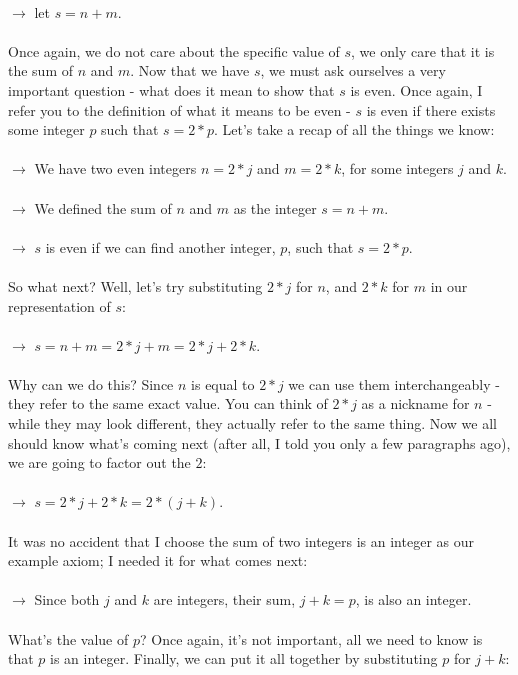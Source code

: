 \documentclass[a4paper,12pt]{article}
\begin{document}
\\
$\rightarrow$ let $s = n + m$.\\
\\
Once again, we do not care about the specific value of $s$, we only care that it is the sum of $n$ and $m$. Now that we have $s$, we must ask ourselves a very important question - what does it mean to show that $s$ is even. Once again, I refer you to the definition of what it means to be even - $s$ is even if there exists some integer $p$ such that $s = 2*p$. Let's take a recap of all the things we know:\\
\\
$\rightarrow$ We have two even integers $n = 2*j$ and $m = 2*k$, for some integers $j$ and $k$.\\
\\
$\rightarrow$ We defined the sum of $n$ and $m$ as the integer $s = n + m$. \\
\\
$\rightarrow$ $s$ is even if we can find another integer, $p$, such that $s = 2*p$.\\
\\
So what next? Well, let's try substituting $2*j$ for $n$, and $2*k$ for $m$ in our representation of $s$: \\
\\
$\rightarrow$ $s = n + m = 2*j + m = 2*j + 2*k$.\\
\\
Why can we do this? Since $n$ is equal to $2*j$ we can use them interchangeably - they refer to the same exact value. You can think of $2*j$ as a nickname for $n$ - while they may look different, they actually refer to the same thing. Now we all should know what's coming next (after all, I told you only a few paragraphs ago), we are going to factor out the $2$:\\
\\
$\rightarrow$ $s = 2*j + 2*k = 2*(j + k)$. \\
\\
It was no accident that I choose the sum of two integers is an integer as our example axiom; I needed it for what comes next:\\
\\
$\rightarrow$ Since both $j$ and $k$ are integers, their sum, $j + k = p$, is also an integer.\\
\\
What's the value of $p$? Once again, it's not important, all we need to know is that $p$ is an integer. Finally, we can put it all together by substituting $p$ for $j + k$:\\
\end{document}
